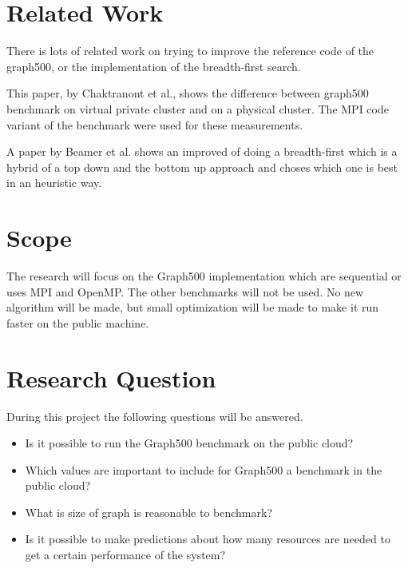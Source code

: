 \documentclass[A4]{scrartcl}
\begin{document}



\section*{Related Work}
There is lots of related work on trying to improve the reference code of the graph500, or the implementation of the breadth-first search. 

This paper, by Chaktranont et al.\cite{chakthranont2014exploring}, shows the difference between graph500 benchmark on virtual private cluster and on a physical cluster. The MPI code variant of the benchmark were used for these measurements.

A paper by Beamer et al.\cite{beamer2011searching} shows an improved of doing a breadth-first which is a hybrid of a top down and the bottom up approach and choses which one is best in an heuristic way. 



\section*{Scope}
The research will focus on the Graph500 implementation which are sequential or uses MPI and OpenMP. The other benchmarks will not be used. No new algorithm will be made, but small optimization will be made to make it run faster on the public machine.

\section*{Research Question}
During this project the following questions will be answered.
\begin{itemize}
\item Is it possible to run the Graph500 benchmark on the public cloud?
\item Which values are important to include for Graph500 a benchmark in the public cloud?
\item What is size of graph is reasonable to benchmark?
\item Is it possible to make predictions about how many resources are needed to get a certain performance of the system?
\end{itemize}
\end{document}

